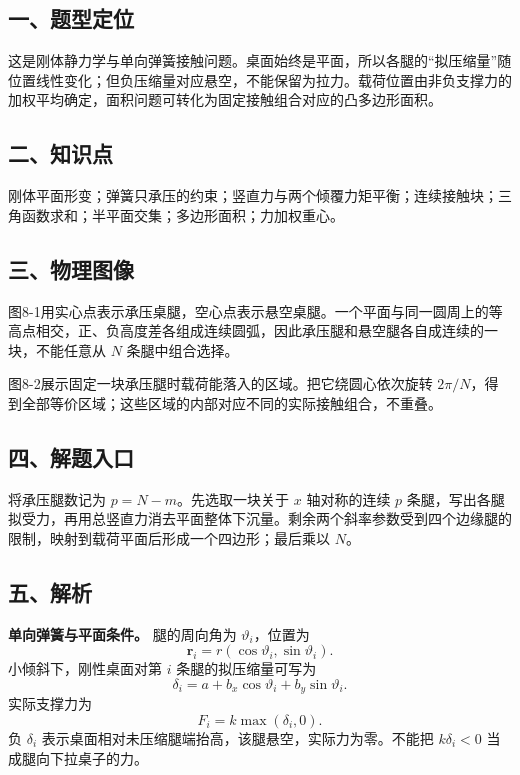 \documentclass[12pt,a4paper,UTF8]{ctexart}
\begin{document}
\subsection{一、题型定位}\label{ux4e00ux9898ux578bux5b9aux4f4d-7}

这是刚体静力学与单向弹簧接触问题。桌面始终是平面，所以各腿的``拟压缩量''随位置线性变化；但负压缩量对应悬空，不能保留为拉力。载荷位置由非负支撑力的加权平均确定，面积问题可转化为固定接触组合对应的凸多边形面积。

\subsection{二、知识点}\label{ux4e8cux77e5ux8bc6ux70b9-7}

刚体平面形变；弹簧只承压的约束；竖直力与两个倾覆力矩平衡；连续接触块；三角函数求和；半平面交集；多边形面积；力加权重心。

\subsection{三、物理图像}\label{ux4e09ux7269ux7406ux56feux50cf-7}

图8-1用实心点表示承压桌腿，空心点表示悬空桌腿。一个平面与同一圆周上的等高点相交，正、负高度差各组成连续圆弧，因此承压腿和悬空腿各自成连续的一块，不能任意从
\(N\) 条腿中组合选择。

图8-2展示固定一块承压腿时载荷能落入的区域。把它绕圆心依次旋转
\(2\pi/N\)，得到全部等价区域；这些区域的内部对应不同的实际接触组合，不重叠。

\subsection{四、解题入口}\label{ux56dbux89e3ux9898ux5165ux53e3-7}

将承压腿数记为 \(p=N-m\)。先选取一块关于 \(x\) 轴对称的连续 \(p\)
条腿，写出各腿拟受力，再用总竖直力消去平面整体下沉量。剩余两个斜率参数受到四个边缘腿的限制，映射到载荷平面后形成一个四边形；最后乘以
\(N\)。

\subsection{五、解析}\label{ux4e94ux89e3ux6790-7}

\textbf{单向弹簧与平面条件。} 腿的周向角为 \(\vartheta_i\)，位置为 \[
\boldsymbol r_i=r(\cos\vartheta_i,\sin\vartheta_i).
\] 小倾斜下，刚性桌面对第 \(i\) 条腿的拟压缩量可写为 \[
\delta_i=a+b_x\cos\vartheta_i+b_y\sin\vartheta_i.
\] 实际支撑力为 \[
\boxed{F_i=k\max(\delta_i,0)}.
\] 负 \(\delta_i\)
表示桌面相对未压缩腿端抬高，该腿悬空，实际力为零。不能把 \(k\delta_i<0\)
当成腿向下拉桌子的力。
\end{document}
